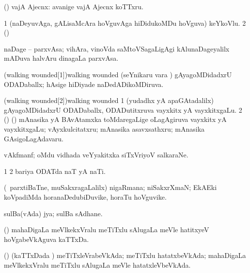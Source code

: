 {\bentry
{} 
\gl{\nA}
\expl{}
\bmng
(\AmA) vajA Ajecnx:  avanige vajA Ajecnx koTTxru. 
\emng
\eentry

\bentry
{} 
\gl{\nA}
\expl{}
\bmng
\bnum
\num{1} (naDeyuvAga, gALisaMcAra hoVguvAga hiDidukoMDu hoVguva) keYkoVlu. 
\num{2} (\ame)  
\enum
\emng
\eentry

\bentry
{} 
\gl{\nA}
\expl{}
\bmng
naDage -- parxvAsa; vihAra, vinoVda saMtoVSagaLigAgi kAlunaDageyalilx mADuva halvAru dinagaLa parxvAsa. 
\emng
\eentry

\bentry
\word(walking wounded[1]){walking wounded}
\gl{\gu}
\expl{}
\bmng
(seYnikaru \mo vara \vi) gAyagoMDidadxrU ODADaballx; hAsige hiDiyade naDedADikoMDiruva. 
\emng
\eentry

\bentry
\word(walking wounded[2]){walking wounded}
\gl{\nA}
\expl{}
\bmng
\bnum
\num{1} (yudadhx yA apaGAtadalilx) gAyagoMDidadxrU ODADaballx, ODADutitxruva vayxkitx yA vayxkitxgaLu. 
\num{2} (\AmA) (\kanmu) mAnasika yA BAvAtamxka toMdaregaLige oLagAgiruva vayxkitx yA vayxkitxgaLu; vAyxkulcitatxru; mAnasika asavxsathxru; mAnasika GAsigoLagAdavaru. 
\enum
\emng
\eentry

\bentry
{} 
\gl{\nA}
\bmng
vAkfmanf; oMdu vidhada veYyakitxka siTxVriyoV salkaraNe. 
\emng
\eentry

\bentry
{} 
\gl{\nA}
\expl{}
\bmng
\bnum
\num{1}  
\num{2} bariya ODATda naT yA naTi. 
\enum
\emng
\eentry

\bentry
{} 
\gl{\nA}
\expl{}
\bmng
(\kanmu\ parxtiBaTne, muSakxragaLalilx) nigaRmana; niSakxrXmaN; EkAEki koVpadiMda horanaDedubiDuvike, horaTu hoVguvike. 
\emng
\eentry

\bentry
{} 
\gl{\nA}
\expl{}
\bmng
sulBa(vAda) jya; sulBa sAdhane. 
\emng
\eentry

\bentry
{} 
\gl{\nA}
\expl{}
\bmng
(\ame) mahaDigaLa meVlkekxVralu meTiTxlu sAlugaLa meVle hatitxyeV hoVgabeVkAguva kaTTxDa. 
\emng
\eentry

\bentry
{} 
\gl{\gu}
\expl{}
\bmng
(\ame) (kaTTxDada \vi) meTiTxleVrabeVkAda; meTiTxlu hatatxbeVkAda; mahaDigaLa meVlkekxVralu meTiTxlu sAlugaLa meVle hatatxleVbeVkAda. 
\emng
\eentry

}
